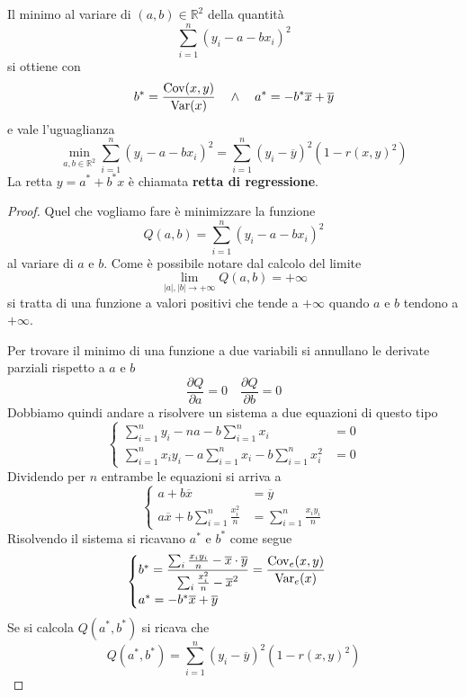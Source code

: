 \begin{theorem}
	Il minimo al variare di $(a, b) \in \mathbb{R}^2$ della quantità
	\[ \sum_{i=1}^n (y_i - a - b x_i)^2 \]
	si ottiene con
	\[ b^* = \frac{\operatorname{Cov}(x, y)}{\operatorname{Var}(x)} \quad \wedge \quad a^* = -b^* \overline{x} + \overline{y} \]
	e vale l'uguaglianza
	\[
		\min_{a, b \in \mathbb{R}^2} \sum_{i=1}^n (y_i - a - b x_i)^2 =
		\sum_{i=1}^n (y_i - \overline{y})^2 (1 - r(x, y)^2)
	\]
	La retta $y = a^* + b^* x$ è chiamata \textbf{retta di regressione}.
	\begin{proof}
		Quel che vogliamo fare è minimizzare la funzione
		\[ Q(a, b) = \sum_{i=1}^n (y_i - a - b x_i)^2 \]
		al variare di $a$ e $b$. Come è possibile notare dal calcolo del limite
		\[ \lim_{|a|, |b| \to +\infty} Q(a, b) = +\infty \]
		si tratta di una funzione a valori positivi che tende a $+\infty$ quando $a$ e $b$
		tendono a $+\infty$.

		Per trovare il minimo di una funzione a due variabili si annullano le derivate parziali rispetto a
		$a$ e $b$
		\[ \frac{\partial Q}{\partial a} = 0 \quad \frac{\partial Q}{\partial b} = 0 \]
		Dobbiamo quindi andare a risolvere un sistema a due equazioni di questo tipo
		\[
			\begin{cases}
				\sum_{i=1}^n y_i - n a - b \sum_{i=1}^n x_i                      & = 0 \\
				\sum_{i=1}^n x_i y_i - a \sum_{i=1}^n x_i - b \sum_{i=1}^n x_i^2 & = 0
			\end{cases}
		\]
		Dividendo per $n$ entrambe le equazioni si arriva a
		\[
			\begin{cases}
				a + b \overline{x}                              & = \overline{y}                   \\
				a \overline{x} + b \sum_{i=1}^n \frac{x_i^2}{n} & = \sum_{i=1}^n \frac{x_i y_i}{n}
			\end{cases}
		\]
		Risolvendo il sistema si ricavano $a^*$ e $b^*$ come segue
		\[
			\begin{cases}
				b^* = \displaystyle\frac{\sum_i \frac{x_i y_i}{n} - \overline{x} \cdot \overline{y}}
				{\sum_i \frac{x_i^2}{n} - \overline{x}^2} =
				\frac{\operatorname{Cov}_e(x, y)}{\operatorname{Var}_e(x)}         \\
				a^* = -b^* \overline{x} + \overline{y} \\
			\end{cases}
		\]
		Se si calcola $Q(a^*, b^*)$ si ricava che
		\[ Q(a^*, b^*) = \sum_{i=1}^n (y_i - \overline{y})^2 (1 - r(x, y)^2) \]
	\end{proof}
\end{theorem}

